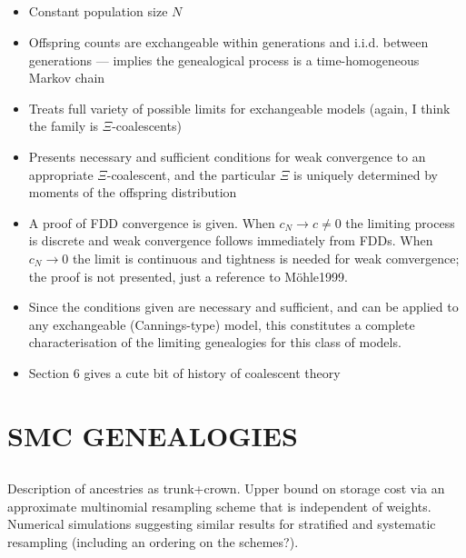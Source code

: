 \documentclass{article}
\begin{document}
\subsection*{\cite{mohle2001}}
\begin{itemize}
\item Constant population size $N$
\item Offspring counts are exchangeable within generations and i.i.d. between generations --- implies the genealogical process is a time-homogeneous Markov chain
\item Treats full variety of possible limits for exchangeable models (again, I think the family is $\Xi$-coalescents)
\item Presents necessary and sufficient conditions for weak convergence to an appropriate $\Xi$-coalescent, and the particular $\Xi$ is uniquely determined by moments of the offspring distribution
\item A proof of FDD convergence is given. When $c_N\to c\neq0$ the limiting process is discrete and weak convergence follows immediately from FDDs. When $c_N\to0$ the limit is continuous and tightness is needed for weak comvergence; the proof is not presented, just a reference to M\"ohle1999.
\item Since the conditions given are necessary and sufficient, and can be applied to any exchangeable (Cannings-type) model, this constitutes a complete characterisation of the limiting genealogies for this class of models.
\item Section 6 gives a cute bit of history of coalescent theory
\end{itemize}


\subsection*{\cite{mohle2003}}






\section*{SMC GENEALOGIES}

\subsection*{\cite{jacob2015}}
Description of ancestries as trunk+crown. Upper bound on storage cost via an approximate multinomial resampling scheme that is independent of weights. Numerical simulations suggesting similar results for stratified and systematic resampling (including an ordering on the schemes?). 
\end{document}
